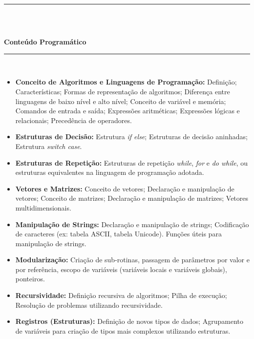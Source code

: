 \noindent\rule{16.5cm}{0.4pt}\\
\\
\vspace{-12mm}
\begin{center}\textbf{Conteúdo Programático}\end{center}
\vspace{-5mm}
\noindent\rule{16.5cm}{0.4pt}
\\
\begin{itemize}

 \item \textbf{Conceito de Algoritmos e Linguagens de Programação:} Defini\c{c}\~ao; Caracter\'isticas; Formas de representa\c{c}\~ao de algoritmos; Diferen\c{c}a entre linguagens de baixo n\'ivel e alto n\'ivel; Conceito de vari\'avel e mem\'oria; Comandos de entrada e saída; Express\~oes aritm\'eticas; Express\~oes l\'ogicas e relacionais; Preced\^encia de operadores.

 \item \textbf{Estruturas de Decisão:} Estrutura \textit{if else}; Estruturas de decis\~ao aninhadas; Estrutura \textit{switch case}.

 \item \textbf{Estruturas de Repetição:} Estruturas de repeti\c{c}\~ao \textit{while}, \textit{for} e \textit{do while}, ou estruturas equivalentes na linguagem de programa\c{c}\~ao adotada.

 \item \textbf{Vetores e Matrizes:} Conceito de vetores; Declara\c{c}\~ao e manipula\c{c}\~ao de vetores; Conceito de matrizes; Declara\c{c}\~ao e manipula\c{c}\~ao de matrizes; Vetores multidimensionais.

 \item \textbf{Manipulação de Strings:} Declara\c{c}\~ao e manipula\c{c}\~ao de strings; Codifica\c{c}\~ao de caracteres (ex: tabela ASCII, tabela Unicode). Fun\c{c}\~oes \'uteis para manipula\c{c}\~ao de strings.

 \item \textbf{Modulariza\c{c}\~ao:} Criação de sub-rotinas, passagem de parâmetros por valor e por refer\^encia, escopo de variáveis (variáveis locais e variáveis globais), ponteiros.

 \item \textbf{Recursividade:} Defini\c{c}\~ao recursiva de algoritmos; Pilha de execu\c{c}\~ao; Resolu\c{c}\~ao de problemas utilizando recursividade.

 \item \textbf{Registros (Estruturas):} Defini\c{c}\~ao de novos tipos de dados; Agrupamento de vari\'aveis para cria\c{c}\~ao de tipos mais complexos utilizando estruturas.

\end{itemize}
